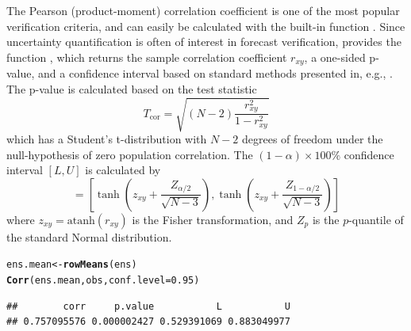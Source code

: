 \documentclass[article]{jss}\usepackage{graphicx, color}
\makeatletter
\newcommand{\hlfunctioncall}[1]{\textcolor[rgb]{0,0.501960784313725,0.752941176470588}{\textbf{#1}}}%
\newenvironment{kframe}{%
 \def\at@end@of@kframe{}%
 \ifinner\ifhmode%
  \def\at@end@of@kframe{\end{minipage}}%
  \begin{minipage}{\columnwidth}%
 \fi\fi%
 \def\FrameCommand##1{\hskip\@totalleftmargin \hskip-\fboxsep
 \colorbox{shadecolor}{##1}\hskip-\fboxsep
     \hskip-\linewidth \hskip-\@totalleftmargin \hskip\columnwidth}%
 \MakeFramed {\advance\hsize-\width
   \@totalleftmargin\z@ \linewidth\hsize
   \@setminipage}}%
 {\par\unskip\endMakeFramed%
 \at@end@of@kframe}
\newenvironment{knitrout}{}{} %
\newcommand{\atanh}{\text{atanh}}
\makeatother
\begin{document}
The Pearson (product-moment) correlation coefficient is one of the most popular verification criteria, and can easily be calculated with the built-in  function .
Since uncertainty quantification is often of interest in forecast verification,  provides the function , which returns the sample correlation coefficient $r_{xy}$, a one-sided p-value, and a confidence interval based on standard methods presented in, e.g., \citet{vonstorch2001statistical}.
The p-value is calculated based on the test statistic
%
\begin{equation}
T_{\text{cor}} = \sqrt{(N-2) \frac{r_{xy}^2}{1 - r_{xy}^2}}
\end{equation}
%
which has a Student's t-distribution with $N-2$ degrees of freedom under the null-hypothesis of zero population correlation.
The $(1-\alpha)\times 100\%$ confidence interval $[L,U]$ is calculated by
%
\begin{equation}
[L, U] = \left[ \tanh\left(z_{xy} + \frac{Z_{\alpha/2}}{\sqrt{N-3}}\right), \tanh\left(z_{xy} + \frac{Z_{1-\alpha/2}}{\sqrt{N-3}}\right)\right]\label{eq:fisherCi}
\end{equation} 
%
where $z_{xy} = \atanh(r_{xy})$ is the Fisher transformation, and $Z_p$ is the $p$-quantile of the standard Normal distribution.
%
\begin{knitrout}
\color{fgcolor}\begin{kframe}
\begin{alltt}
ens.mean <- \hlfunctioncall{rowMeans}(ens)
\hlfunctioncall{Corr}(ens.mean, obs, conf.level=0.95)
\end{alltt}
\begin{verbatim}
##        corr     p.value           L           U 
## 0.757095576 0.000002427 0.529391069 0.883049977
\end{verbatim}
\end{kframe}
\end{knitrout}
\end{document}
